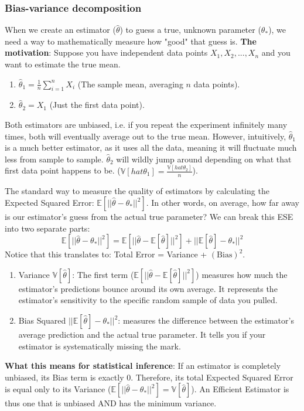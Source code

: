 \documentclass[../Probability.tex]{subfiles}
\begin{document}
\subsubsection{Bias-variance decomposition}
When we create an estimator ($\hat{\theta}$) to guess a true, unknown parameter ($\theta_*$), we need a way to mathematically measure how "good" that guess is.\newline
\textbf{The motivation}: Suppose you have independent data points $X_1, X_2, ..., X_n$ and you want to estimate the true mean.
\begin{enumerate}
    \item $\hat{\theta}_1 = \frac{1}{n} \sum_{i=1}^n X_i$ (The sample mean, averaging $n$ data points).
    \item $\hat{\theta}_2 = X_1$ (Just the first data point).
\end{enumerate}
Both estimators are unbiased, i.e. if you repeat the experiment infinitely many times, both will eventually average out to the true mean.\newline
However, intuitively, $\hat{\theta}_1$ is a much better estimator, as it uses all the data, meaning it will fluctuate much less from sample to sample. $\hat{\theta}_2$ will wildly jump around depending on what that first data point happens to be. ($\mathbb{V}[hat{\theta}_1] = \frac{\mathbb{V}[hat{\theta}_2]}{n}$).

\medskip
\noindent The standard way to measure the quality of estimators by calculating the Expected Squared Error: $\mathbb{E}[||\hat{\theta} - \theta_*||^2]$. In other words, on average, how far away is our estimator's guess from the actual true parameter?
We can break this ESE into two separate parts:
$$\mathbb{E}[||\hat{\theta} - \theta_*||^2] = \mathbb{E}[||\hat{\theta} - \mathbb{E}[\hat{\theta}]||^2] + ||\mathbb{E}[\hat{\theta}] - \theta_*||^2$$
Notice that this translates to: Total Error = Variance + $(\text{Bias})^2$.
\begin{enumerate}
    \item Variance $\mathbb{V}[\hat{\theta}]$: The first term ($\mathbb{E}[||\hat{\theta} - \mathbb{E}[\hat{\theta}]||^2]$) measures how much the estimator's predictions bounce around its own average. It represents the estimator's sensitivity to the specific random sample of data you pulled.
    \item Bias Squared $||\mathbb{E}[\hat{\theta}] - \theta_*||^2$: measures the difference between the estimator's average prediction and the actual true parameter. It tells you if your estimator is systematically missing the mark.
\end{enumerate}
\textbf{What this means for statistical inference}: If an estimator is completely unbiased, its Bias term is exactly 0. Therefore, its total Expected Squared Error is equal only to its Variance ($\mathbb{E}[||\hat{\theta} - \theta_*||^2] = \mathbb{V}[\hat{\theta}]$).\newline
An Efficient Estimator is thus one that is unbiased AND has the minimum variance.
\end{document}
